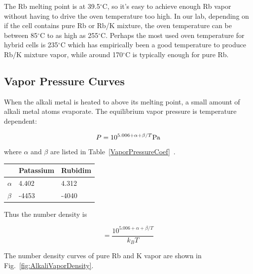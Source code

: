 The Rb melting point is at 39.5$^{\circ}$C, so it's easy to achieve enough Rb vapor without having to drive the oven temperature too high. In our lab, depending on if the cell contains pure Rb or Rb/K mixture, the oven temperature can be between 85$^{\circ}$C to as high as 255$^{\circ}$C. Perhaps the most used oven temperature for hybrid cells is 235$^{\circ}$C which has empirically been a good temperature to produce Rb/K mixture vapor, while around 170$^{\circ}$C is typically enough for pure Rb.

\subsection{Vapor Pressure Curves}

When the alkali metal is heated to above its melting point, a small amount of alkali metal atoms evaporate. The equilibrium vapor pressure is temperature dependent:

\begin{equation}
P=10^{5.006+\alpha + \beta/T} {\rm Pa}
\end{equation}
where $\alpha$ and $\beta$ are listed in Table~\ref{VaporPressureCoef}~\cite{Alcock}.

\begin{center}\label{VaporPressureCoef}
	\begin{tabular}{| l | l | l |}
		\hline
		& Patassium & Rubidim \\ \hline
		$\alpha$ & 4.402 & 4.312 \\ \hline
		$\beta$ & -4453 & -4040 \\ \hline
	\end{tabular}
\end{center}

Thus the number density is 

\begin{equation}
[A]=\frac{10^{5.006+\alpha+\beta/T}}{k_{B}T}
\end{equation}

The number density curves of pure Rb and K vapor are shown in Fig.~\ref{fig:AlkaliVaporDensity}.

